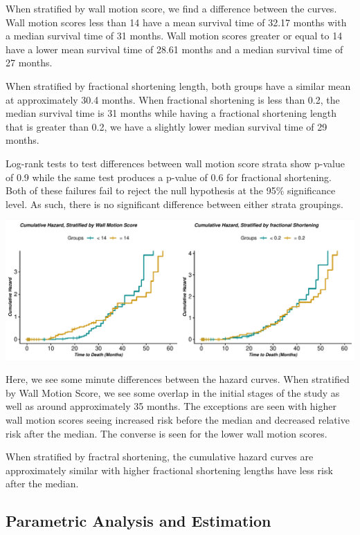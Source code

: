 \documentclass[
]{article}
\begin{document}
When stratified by wall motion score, we find a difference between the
curves. Wall motion scores less than 14 have a mean survival time of
32.17 months with a median survival time of 31 months. Wall motion
scores greater or equal to 14 have a lower mean survival time of 28.61
months and a median survival time of 27 months.

When stratified by fractional shortening length, both groups have a
similar mean at approximately 30.4 months. When fractional shortening is
less than 0.2, the median survival time is 31 months while having a
fractional shortening length that is greater than 0.2, we have a
slightly lower median survival time of 29 months.

Log-rank tests to test differences between wall motion score strata show
p-value of 0.9 while the same test produces a p-value of 0.6 for
fractional shortening. Both of these failures fail to reject the null
hypothesis at the 95\% significance level. As such, there is no
significant difference between either strata groupings.

\begin{center}\includegraphics{markdown_files/figure-latex/km.haz2-1} \end{center}

Here, we see some minute differences between the hazard curves. When
stratified by Wall Motion Score, we see some overlap in the initial
stages of the study as well as around approximately 35 months. The
exceptions are seen with higher wall motion scores seeing increased risk
before the median and decreased relative risk after the median. The
converse is seen for the lower wall motion scores.

When stratified by fractral shortening, the cumulative hazard curves are
approximately similar with higher fractional shortening lengths have
less risk after the median.

\hypertarget{parametric-analysis-and-estimation}{%
\subsection{Parametric Analysis and
Estimation}\label{parametric-analysis-and-estimation}}
\end{document}
